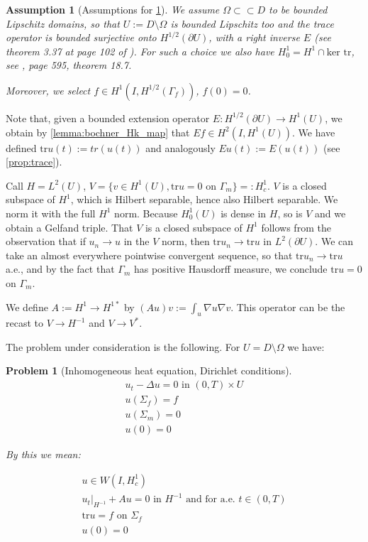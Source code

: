 \documentclass[english,a4paper,12pt,oneside]{scrbook}
\theoremstyle{break}
\newtheorem{ass}[equation]{Assumption}
\newtheorem{pb}[equation]{Problem}
\theoremstyle{remark}
\newcommand{\tr}{\text{tr}}
\newcommand{\cc}{\subset\subset}
\begin{document}
\begin{ass}[Assumptions for \cref{pb:diri}]
\label{ass:diri}
We assume $\Omega \cc D $ to be bounded Lipschitz domains, so that $U:=D\setminus \Omega$ is bounded Lipschitz too and  the trace operator is bounded surjective onto $H^{1/2}(\partial U)$, with a right inverse $E$ (see theorem 3.37 at page 102 of \cite{mclean}). For such a choice we also have $H^1_0=H^1\cap \text{ker }\tr$, see \cite{leoni}, page 595, theorem 18.7.

Moreover, we select $f \in H^1(I, H^{1/2}(\Gamma_f))$, $f(0)=0$.
\end{ass}

Note that, given a bounded extension operator $E: H^{1/2}(\partial U) \rightarrow H^1(U)$, we obtain by \cref{lemma:bochner_Hk_map} that $Ef \in H^2(I, H^1(U))$. We have defined $\tr u (t):= tr(u(t))$ and analogously $Eu(t):=E(u(t))$ (see \cref{prop:trace}).

Call $H=L^2(U)$, $V=\{ v \in H^1(U), \tr u = 0 \text{ on } \Gamma_m\}=:H^1_c$. $V$ is a closed subspace of $H^1$, which is Hilbert separable, hence also Hilbert separable. We norm it with the full $H^1$ norm. Because $H^1_0(U)$ is dense in $H$, so is $V$ and we obtain a Gelfand triple. That $V$ is a closed subspace of $H^1$ follows from the observation that if $u_n\rightarrow u$ in the $V$ norm, then $\tr u_n \rightarrow \tr u$ in $L^2(\partial U)$. We can take an almost everywhere pointwise convergent sequence, so that $\tr u_n \rightarrow \tr u$ a.e., and by the fact that $\Gamma_m$ has positive Hausdorff measure, we conclude $\tr u = 0$ on $\Gamma_m$.

We define $A:= H^1 \rightarrow H^{1*}$ by $(Au)v:=\int_u\nabla u \nabla v$. This operator can be the recast to $V\rightarrow H^{-1}$ and $V\rightarrow V^*$.

The problem under consideration is the following. For $U = D\setminus \Omega$ we have:

\begin{pb}[Inhomogeneous heat equation, Dirichlet conditions]
\label{pb:diri}
\begin{align}
u_t - \Delta u = 0 \text{ in } (0,T)\times U\\
u(\Sigma_f)=f\\
u(\Sigma_m)=0\\
u(0)=0
\end{align}

By this we mean:

\begin{align}
u \in W(I,H^1_c) \\
u_t|_{H^{-1}} + A u = 0 \text{ in }H^{-1} \text{ and for a.e. } t \in (0,T) \\
\tr u = f \text{ on } \Sigma_f\\
u(0)=0
\end{align}

\end{pb}
\end{document}
